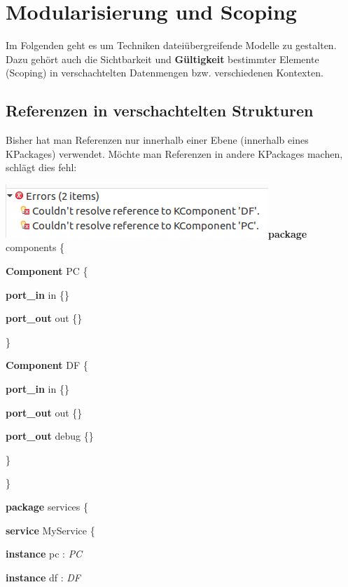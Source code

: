 \documentclass[]{article}
\begin{document}
\section[Modularisierung und
Scoping]{\texorpdfstring{\protect\hypertarget{anchor-42}{}{}Modularisierung
und
Scoping}{Modularisierung und Scoping}}\label{modularisierung-und-scoping}

Im Folgenden geht es um Techniken dateiübergreifende Modelle zu
gestalten. Dazu gehört auch die Sichtbarkeit und \textbf{Gültigkeit
}bestimmter Elemente (Scoping) in verschachtelten Datenmengen bzw.
verschiedenen Kontexten.

\subsection[Referenzen in verschachtelten
Strukturen]{\texorpdfstring{\protect\hypertarget{anchor-43}{}{}\protect\hypertarget{anchor-44}{}{}Referenzen
in verschachtelten
Strukturen}{Referenzen in verschachtelten Strukturen}}\label{referenzen-in-verschachtelten-strukturen}

Bisher hat man Referenzen nur innerhalb einer Ebene (innerhalb eines
KPackages) verwendet. Möchte man Referenzen in andere KPackages machen,
schlägt dies fehl:

\includegraphics[width=3.90630in,height=0.79170in]{./Pictures/10000201000001770000004CA84119E1BC561581.png}\textbf{package}
components \{

\textbf{Component} PC \{

\textbf{port\_in} in \{\}

\textbf{port\_out} out \{\}

\}

\textbf{Component} DF \{

\textbf{port\_in} in \{\}

\textbf{port\_out} out \{\}

\textbf{port\_out} debug \{\}

\}

\}

\textbf{package} services \{

\textbf{service} MyService \{

\textbf{instance} pc : \emph{PC}

\textbf{instance} df : \emph{DF}
\end{document}
